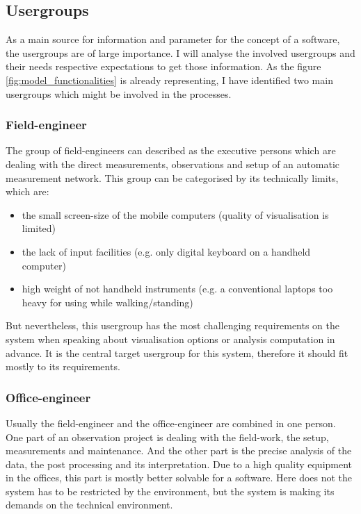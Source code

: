 \subsection{Usergroups}
As a main source for information and parameter for the concept of a software, the usergroups are of large importance. I will analyse the involved usergroups and their needs respective expectations to get those information. As the figure \ref{fig:model_functionalities} is already representing, I have identified two main usergroups which might be involved in the processes.

\subsubsection{Field-engineer}
The group of field-engineers can described as the executive persons which are dealing with the direct measurements, observations and setup of an automatic measurement network. This group can be categorised by its technically limits, which are:
\begin{itemize}
\item the small screen-size of the mobile computers (quality of visualisation is limited)
\item the lack of input facilities (e.g. only digital keyboard on a handheld computer)
\item high weight of not handheld instruments (e.g. a conventional laptops too heavy for using while walking/standing)
\end{itemize}
But nevertheless, this usergroup has the most challenging requirements on the system when speaking about visualisation options or analysis computation in advance. It is the central target usergroup for this system, therefore it should fit mostly to its requirements.


\subsubsection{Office-engineer}
Usually the field-engineer and the office-engineer are combined in one person. One part of an observation project is dealing with the field-work, the setup, measurements and maintenance. And the other part is the precise analysis of the data, the post processing and its interpretation. Due to a high quality equipment in the offices, this part is mostly better solvable for a software. Here does not the system has to be restricted by the environment, but the system is making its demands on the technical environment.



